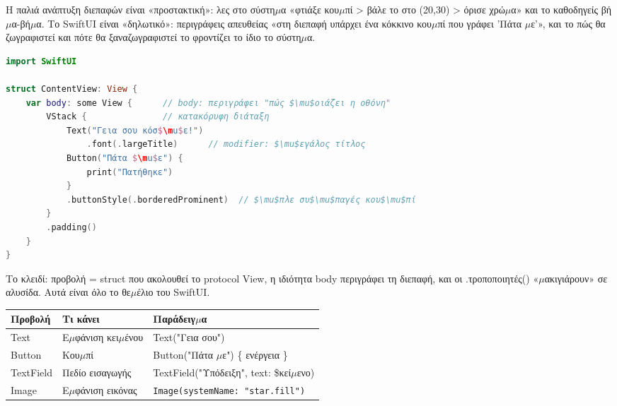 


Η παλιά ανάπτυξη διεπαφών είναι «προστακτική»: λες στο σύστη$\mu$α «φτιάξε κου$\mu$πί > βάλε το στο (20,30) > όρισε χρώ$\mu$α» και το καθοδηγείς βή$\mu$α-βή$\mu$α. Το SwiftUI είναι «δηλωτικό»: περιγράφεις απευθείας «στη διεπαφή υπάρχει ένα κόκκινο κου$\mu$πί που γράφει 'Πάτα $\mu$ε'», και το πώς θα ζωγραφιστεί και πότε θα ξαναζωγραφιστεί το φροντίζει το ίδιο το σύστη$\mu$α.

\begin{lstlisting}[language=Swift]
import SwiftUI

struct ContentView: View {
    var body: some View {      // body: περιγράφει "πώς $\mu$οιάζει η οθόνη"
        VStack {               // κατακόρυφη διάταξη
            Text("Γεια σου κόσ$\mu$ε!")
                .font(.largeTitle)      // modifier: $\mu$εγάλος τίτλος
            Button("Πάτα $\mu$ε") {
                print("Πατήθηκε")
            }
            .buttonStyle(.borderedProminent)  // $\mu$πλε συ$\mu$παγές κου$\mu$πί
        }
        .padding()
    }
}
\end{lstlisting}

Το κλειδί: προβολή = struct που ακολουθεί το protocol View, η ιδιότητα body περιγράφει τη διεπαφή, και οι .τροποποιητές() «$\mu$ακιγιάρουν» σε αλυσίδα. Αυτά είναι όλο το θε$\mu$έλιο του SwiftUI.


\begin{center}
\begin{tabularx}{\linewidth}{|X|X|X|}
\hline
\textbf{Προβολή} & \textbf{Τι κάνει} & \textbf{Παράδειγ$\mu$α} \tabularnewline
\hline
Text & Ε$\mu$φάνιση κει$\mu$ένου & Text("Γεια σου") \tabularnewline
Button & Κου$\mu$πί & Button("Πάτα $\mu$ε") \{ ενέργεια \} \tabularnewline
TextField & Πεδίο εισαγωγής & TextField("Υπόδειξη", text: \$κεί$\mu$ενο) \tabularnewline
Image & Ε$\mu$φάνιση εικόνας & \texttt{Image(systemName: "star.\allowbreak fill")} \tabularnewline
\hline
\end{tabularx}
\end{center}

